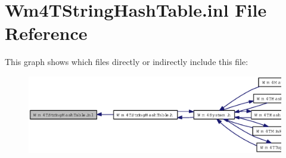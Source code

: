 \section{Wm4TString\-Hash\-Table.inl File Reference}
\label{Wm4TStringHashTable_8inl}


This graph shows which files directly or indirectly include this file:\begin{figure}[H]
\begin{center}
\leavevmode
\includegraphics[width=386pt]{Wm4TStringHashTable_8inl__dep__incl}
\end{center}
\end{figure}
